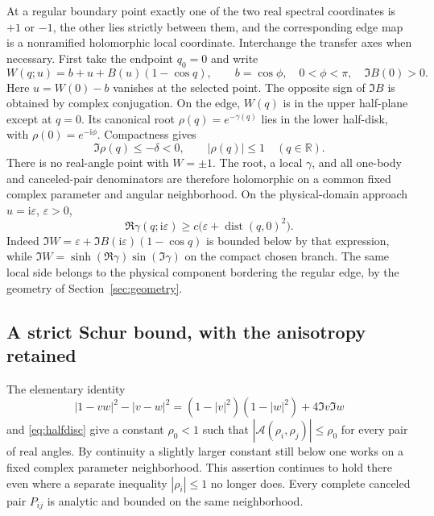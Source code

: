 \documentclass[11pt]{article}
\numberwithin{equation}{section}
\theoremstyle{definition}
\newcommand{\R}{\mathbb R}
\newcommand{\ii}{\mathrm i}
\newcommand{\eps}{\varepsilon}
\newcommand{\dist}{\operatorname{dist}}
\newcommand{\cA}{\mathscr A}
\begin{document}
At a regular boundary point exactly one of the two real spectral
coordinates is $+1$ or $-1$, the other lies strictly between them, and
the corresponding edge map is a nonramified holomorphic local
coordinate. Interchange the transfer axes when necessary. First take
the endpoint $q_0=0$ and write
\begin{equation}\label{eq:positiveedge}
 W(q;u)=b+u+B(u)(1-\cos q),\qquad
 b=\cos\phi,\quad 0<\phi<\pi,\quad \Im B(0)>0.
\end{equation}
Here $u=W(0)-b$ vanishes at the selected point. The opposite sign of
$\Im B$ is obtained by complex conjugation. On the edge, $W(q)$ is
in the upper half-plane except at $q=0$. Its canonical root
$\rho(q)=e^{-\gamma(q)}$ lies in the lower half-disk, with
$\rho(0)=e^{-\ii\phi}$. Compactness gives
\begin{equation}\label{eq:halfdisc}
 \Im\rho(q)\le-\delta<0,\qquad |\rho(q)|\le1
 \quad(q\in\R).
\end{equation}
There is no real-angle point with $W=\pm1$. The root, a local
$\gamma$, and all one-body and canceled-pair denominators are therefore
holomorphic on a common fixed complex parameter and angular
neighborhood. On the physical-domain approach $u=\ii\eps$, $\eps>0$,
\begin{equation}\label{eq:attenuation}
 \Re\gamma(q;\ii\eps)\ge c\bigl(\eps+\dist(q,0)^2\bigr).
\end{equation}
Indeed $\Im W=\eps+\Im B(\ii\eps)(1-\cos q)$ is bounded below by
that expression, while
$\Im W=\sinh(\Re\gamma)\sin(\Im\gamma)$ on the compact chosen branch.
The same local side belongs to the physical component bordering the
regular edge, by the geometry of Section~\ref{sec:geometry}.

\subsection{A strict Schur bound, with the anisotropy retained}
The elementary identity
\begin{equation}\label{eq:schurdifference}
 |1-vw|^2-|v-w|^2
 =(1-|v|^2)(1-|w|^2)+4\Im v\Im w
\end{equation}
and \eqref{eq:halfdisc} give a constant $\rho_0<1$ such that
$|\cA(\rho_i,\rho_j)|\le\rho_0$ for every pair of real angles.
By continuity a slightly larger constant still below one works on a
fixed complex parameter neighborhood. This assertion continues to hold
there even where a separate inequality $|\rho_i|\le1$ no longer does.
Every complete canceled pair $P_{ij}$ is analytic and bounded on the
same neighborhood.
\end{document}
